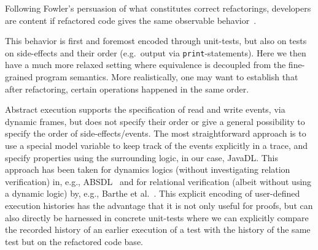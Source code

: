 Following Fowler's persuasion of what constitutes correct refactorings, developers are content if refactored code gives the same observable behavior~\cite{fowler:refactoring2nd}.

This behavior is first and foremost encoded through unit-tests, but also on tests on side-effects and their order (e.g.\ output via \texttt{print}-statements).
Here we then have a much more relaxed setting where equivalence is decoupled from the fine-grained program semantics.
More realistically, one may want to establish that after refactoring, certain operations happened in the same order.

Abstract execution supports the specification of read and write events, via dynamic frames, but does not specify their order or give a general possibility to
specify the order of side-effects/events. The most straightforward approach is to use a special model variable to keep track of the events explicitly in a trace, 
and specify properties using the surrounding logic, in our case, JavaDL. This approach has been taken for dynamics logics (without investigating relation verification) in, e.g., ABSDL~\cite{DBLP:journals/jlp/DinO14} and for relational verification (albeit without using a dynamic logic) by, e.g., Barthe et al.~\cite{DBLP:conf/fmcad/BartheEGGKM19}.
This explicit encoding of user-defined execution histories has the advantage that it is not only useful for proofs, but can also directly be harnessed in concrete unit-tests where we can explicitly compare the recorded history of an earlier execution of a test with the history of the same test but on the refactored code base.


